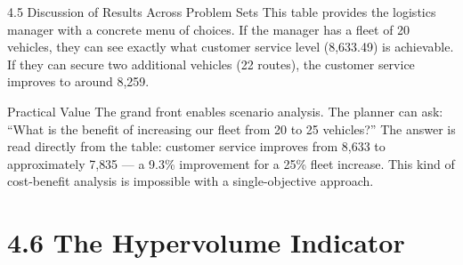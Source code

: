 \documentclass[aspectratio=169,10pt]{beamer}
\begin{document}
\begin{frame}[allowframebreaks]{4.5 Discussion of Results Across Problem Sets}
  This table provides the logistics manager with a concrete menu of choices.
  If the manager has a fleet of 20 vehicles, they can see exactly what customer
  service level (8{,}633.49) is achievable.  If they can secure two additional
  vehicles (22 routes), the customer service improves to around 8{,}259.

  \begin{alertblock}{Practical Value}
    The grand front enables scenario analysis.  The planner can ask: ``What is
    the benefit of increasing our fleet from 20 to 25 vehicles?''  The answer is
    read directly from the table: customer service improves from 8{,}633 to
    approximately 7{,}835 --- a 9.3\% improvement for a 25\% fleet increase.
    This kind of cost-benefit analysis is impossible with a single-objective
    approach.
  \end{alertblock}

\end{frame}

\section{4.6 The Hypervolume Indicator}
\end{document}

